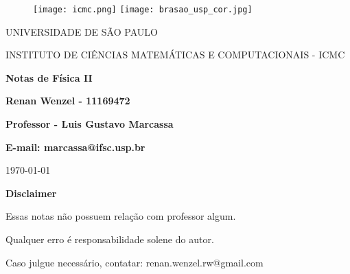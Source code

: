 \documentclass{article}
\begin{document}
\begin{figure}[ht]
	\texttt{[image: icmc.png]}
	\hspace{7cm}
	\texttt{[image: brasao\_usp\_cor.jpg]}
	\endminipage
\end{figure}

\begin{center}
	\vspace{1cm}
	\LARGE
	UNIVERSIDADE DE S\~AO PAULO

	\vspace{1.3cm}
	\LARGE
	INSTITUTO DE CI\^ENCIAS MATEM\'ATICAS E COMPUTACIONAIS - ICMC

	\vspace{1.7cm}
	\Large
	\textbf{Notas de Física II}

	\vspace{1.3cm}
	\large
	\textbf{Renan Wenzel - 11169472}

	\vspace{1.3cm}
	\large
	\textbf{Professor - Luis Gustavo Marcassa}

	\textbf{E-mail: marcassa@ifsc.usp.br}

	\vspace{1.3cm}
	\today
\end{center}

\newpage
\textbf{{\Huge Disclaimer}}
\vspace{5cm}

{\huge Essas notas não possuem relação com professor algum.

	Qualquer erro é responsabilidade solene do autor.

	Caso julgue necessário, contatar: renan.wenzel.rw@gmail.com}
\newpage

\tableofcontents

\newpage
\end{document}
